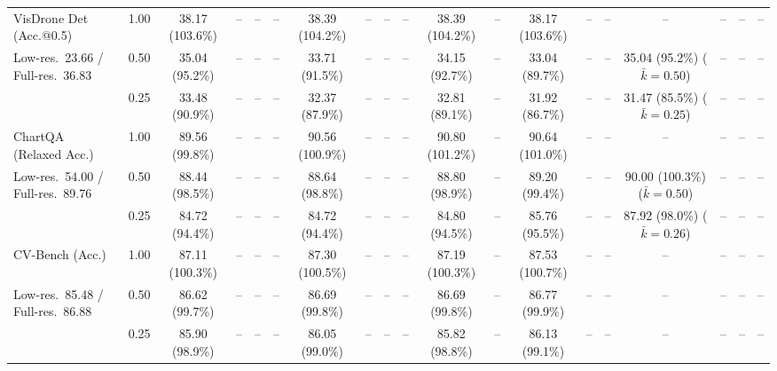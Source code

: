 \begin{table}[t]
{\begin{tabular}{l c | c c c c | c c c c | c c | c c c | c c c c}
\cmidrule(lr){1-19}
VisDrone Det (Acc.@0.5) & 1.00 & \cellcolor{gray!15}38.17 (103.6\%) & -- & -- & -- & \cellcolor{gray!15}38.39 (104.2\%) & -- & -- & -- & \cellcolor{gray!15}38.39 (104.2\%) & -- & \cellcolor{gray!15}38.17 (103.6\%) & -- & -- & -- & -- & -- & -- \\
{\footnotesize Low-res.\ 23.66 / Full-res.\ 36.83} & 0.50 & 35.04 (95.2\%) & -- & -- & -- & 33.71 (91.5\%) & -- & -- & -- & 34.15 (92.7\%) & -- & 33.04 (89.7\%) & -- & -- & 35.04 (95.2\%) {\footnotesize ($\bar k{=}0.50$)} & -- & -- & -- \\
 & 0.25 & 33.48 (90.9\%) & -- & -- & -- & 32.37 (87.9\%) & -- & -- & -- & 32.81 (89.1\%) & -- & 31.92 (86.7\%) & -- & -- & 31.47 (85.5\%) {\footnotesize ($\bar k{=}0.25$)} & -- & -- & -- \\
\cmidrule(lr){1-19}
ChartQA (Relaxed Acc.) & 1.00 & \cellcolor{gray!15}89.56 (99.8\%) & -- & -- & -- & \cellcolor{gray!15}90.56 (100.9\%) & -- & -- & -- & \cellcolor{gray!15}90.80 (101.2\%) & -- & \cellcolor{gray!15}90.64 (101.0\%) & -- & -- & -- & -- & -- & -- \\
{\footnotesize Low-res.\ 54.00 / Full-res.\ 89.76} & 0.50 & \cellcolor{gray!15}88.44 (98.5\%) & -- & -- & -- & \cellcolor{gray!15}88.64 (98.8\%) & -- & -- & -- & \cellcolor{gray!15}88.80 (98.9\%) & -- & \cellcolor{gray!15}89.20 (99.4\%) & -- & -- & \cellcolor{gray!15}90.00 (100.3\%) {\footnotesize ($\bar k{=}0.50$)} & -- & -- & -- \\
 & 0.25 & 84.72 (94.4\%) & -- & -- & -- & 84.72 (94.4\%) & -- & -- & -- & 84.80 (94.5\%) & -- & 85.76 (95.5\%) & -- & -- & 87.92 (98.0\%) {\footnotesize ($\bar k{=}0.26$)} & -- & -- & -- \\
\cmidrule(lr){1-19}
CV-Bench (Acc.) & 1.00 & \cellcolor{gray!15}87.11 (100.3\%) & -- & -- & -- & \cellcolor{gray!15}87.30 (100.5\%) & -- & -- & -- & \cellcolor{gray!15}87.19 (100.3\%) & -- & \cellcolor{gray!15}87.53 (100.7\%) & -- & -- & -- & -- & -- & -- \\
{\footnotesize Low-res.\ 85.48 / Full-res.\ 86.88} & 0.50 & \cellcolor{gray!15}86.62 (99.7\%) & -- & -- & -- & \cellcolor{gray!15}86.69 (99.8\%) & -- & -- & -- & \cellcolor{gray!15}86.69 (99.8\%) & -- & \cellcolor{gray!15}86.77 (99.9\%) & -- & -- & -- & -- & -- & -- \\
 & 0.25 & \cellcolor{gray!15}85.90 (98.9\%) & -- & -- & -- & \cellcolor{gray!15}86.05 (99.0\%) & -- & -- & -- & \cellcolor{gray!15}85.82 (98.8\%) & -- & \cellcolor{gray!15}86.13 (99.1\%) & -- & -- & -- & -- & -- & -- \\
\cmidrule(lr){1-19}

\end{tabular}}
\end{table}
